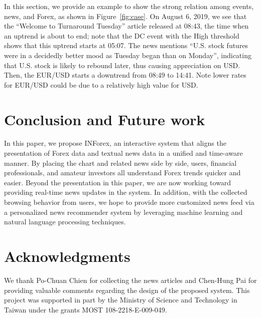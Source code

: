 \documentclass[sigconf]{acmart}
\begin{document}
In this section, we provide an example to show the strong relation among
events, news, and Forex, as shown in Figure~\ref{fig:case}.
On August 6, 2019, we see that the ``Welcome to Turnaround Tuesday''
article released at 08:43, the time when an uptrend is about to end; note that the DC
event with the High threshold shows that this uptrend starts at 05:07.
The news mentions ``U.S. stock futures were in a decidedly better mood as
Tuesday began than on Monday'', indicating that U.S. stock is likely to rebound
later, thus causing appreciation on USD.
Then, the EUR/USD starts a downtrend from 08:49 to 14:41.
Note lower rates for EUR/USD could be due to a relatively high value for USD.   

\section{Conclusion and Future work}\label{sec:conclude}
In this paper, we propose INForex, an interactive system that aligns the
presentation of Forex data and textual news data in a unified and
time-aware manner.
By placing the chart and related news side by side, users, financial
professionals, and amateur investors all understand Forex trends
quicker and easier.
Beyond the presentation in this paper, we are now working toward providing
real-time news updates in the system.
In addition, with the collected browsing behavior from users, we hope to
provide more customized news feed via a personalized news recommender system
by leveraging machine learning and natural language processing techniques.   

\section{Acknowledgments}
We thank Po-Chuan Chien for collecting the news articles and Chen-Hung Pai for providing valuable comments regarding the design of the proposed system.
This project was supported in part by the Ministry of Science and Technology in Taiwan under the grants MOST 108-2218-E-009-049.



\end{document}
